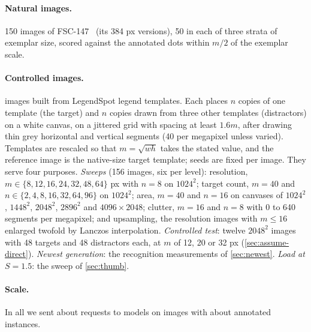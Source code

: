 \paragraph{Natural images.} 150 images of FSC-147~\cite{ranjan2021fsc147} (its 384 px versions), 50 in each of three strata of exemplar size, scored against the annotated dots within $m/2$ of the exemplar scale.

\paragraph{Controlled images.} \CscaleCtrl{} images built from LegendSpot legend templates. Each places $n$ copies of one template (the target) and $n$ copies drawn from three other templates (distractors) on a white canvas, on a jittered grid with spacing at least $1.6m$, after drawing thin grey horizontal and vertical segments (40 per megapixel unless varied). Templates are rescaled so that $m = \sqrt{wh}$ takes the stated value, and the reference image is the native-size target template; seeds are fixed per image. They serve four purposes. \emph{Sweeps} (156 images, six per level): resolution, $m \in \{8, 12, 16, 24, 32, 48, 64\}$ px with $n = 8$ on $1024^2$; target count, $m = 40$ and $n \in \{2, 4, 8, 16, 32, 64, 96\}$ on $1024^2$; area, $m = 40$ and $n = 16$ on canvases of $1024^2$, $1448^2$, $2048^2$, $2896^2$ and $4096 \times 2048$; clutter, $m = 16$ and $n = 8$ with 0 to 640 segments per megapixel; and upsampling, the resolution images with $m \le 16$ enlarged twofold by Lanczos interpolation. \emph{Controlled test}: twelve $2048^2$ images with 48 targets and 48 distractors each, at $m$ of 12, 20 or 32 px (\cref{sec:assume-direct}). \emph{Newest generation}: the recognition measurements of \cref{sec:newest}. \emph{Load at $S = 1.5$}: the sweep of \cref{sec:thumb}.

\paragraph{Scale.} In all we sent about \CscaleCalls{} requests to \CscaleModels{} models on \CscaleImages{} images with about \CscaleInst{} annotated instances.

